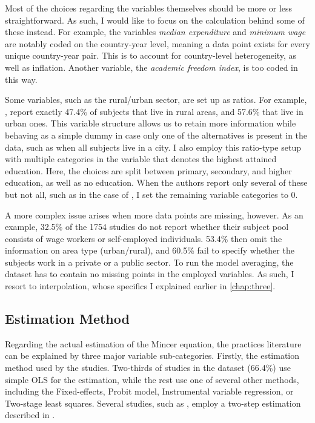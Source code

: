 
Most of the choices regarding the variables themselves should be more or less straightforward. As such, I would like to focus on the calculation behind some of these instead. For example, the variables \textit{median expenditure} and \textit{minimum wage} are notably coded on the country-year level, meaning a data point exists for every unique country-year pair. This is to account for country-level heterogeneity, as well as inflation. Another variable, the \textit{academic freedom index}, is too coded in this way.

Some variables, such as the rural/urban sector, are set up as ratios. For example, \cite{paweenawat2015private}, report exactly 47.4\% of subjects that live in rural areas, and 57.6\% that live in urban ones. This variable structure allows us to retain more information while behaving as a simple dummy in case only one of the alternatives is present in the data, such as when all subjects live in a city. I also employ this ratio-type setup with multiple categories in the variable that denotes the highest attained education. Here, the choices are split between primary, secondary, and higher education, as well as no education. When the authors report only several of these but not all, such as in the case of \cite{chanis2021tell}, I set the remaining variable categories to 0.

A more complex issue arises when more data points are missing, however. As an example, 32.5\% of the 1754 studies do not report whether their subject pool consists of wage workers or self-employed individuals. 53.4\% then omit the information on area type (urban/rural), and 60.5\% fail to specify whether the subjects work in a private or a public sector. To run the model averaging, the dataset has to contain no missing points in the employed variables. As such, I resort to interpolation, whose specifics I explained earlier in \autoref{chap:three}.

\subsection{Estimation Method}
\label{subsec:estim_method}

Regarding the actual estimation of the Mincer equation, the practices literature can be explained by three major variable sub-categories. Firstly, the estimation method used by the studies. Two-thirds of studies in the dataset (66.4\%) use simple \ac{OLS} for the estimation, while the rest use one of several other methods, including the Fixed-effects, Probit model, Instrumental variable regression, or Two-stage least squares. Several studies, such as \cite{debrauw2008reconciling}, employ a two-step estimation described in \cite{heckman1974empirical}.

